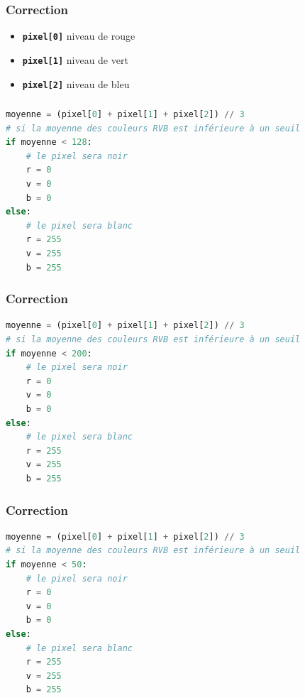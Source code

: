 \documentclass[svgnames,11pt]{beamer}
\begin{document}
\begin{frame}
    \frametitle{Correction}

    
\begin{itemize}
    \item \textbf{\texttt{pixel[0]}} niveau de rouge
    \item \textbf{\texttt{pixel[1]}} niveau de vert
    \item \textbf{\texttt{pixel[2]}} niveau de bleu
\end{itemize}
\end{frame}
\begin{frame}[fragile]
    \frametitle{}

    \begin{center}
        \begin{lstlisting}[language=Python , basicstyle=\ttfamily\small, xleftmargin=1em, xrightmargin=1em]
moyenne = (pixel[0] + pixel[1] + pixel[2]) // 3
# si la moyenne des couleurs RVB est inférieure à un seuil
if moyenne < 128:
    # le pixel sera noir
    r = 0
    v = 0
    b = 0
else:
    # le pixel sera blanc
    r = 255
    v = 255
    b = 255
\end{lstlisting}
        \label{CODE}
    \end{center}

\end{frame}
\begin{frame}[fragile]
    \frametitle{Correction}

    \begin{center}
        \begin{lstlisting}[language=Python , basicstyle=\ttfamily\small, xleftmargin=1em, xrightmargin=1em]
moyenne = (pixel[0] + pixel[1] + pixel[2]) // 3
# si la moyenne des couleurs RVB est inférieure à un seuil
if moyenne < 200:
    # le pixel sera noir
    r = 0
    v = 0
    b = 0
else:
    # le pixel sera blanc
    r = 255
    v = 255
    b = 255
\end{lstlisting}
        \label{CODE}
    \end{center}

\end{frame}
\begin{frame}[fragile]
    \frametitle{Correction}

    \begin{center}
        \begin{lstlisting}[language=Python , basicstyle=\ttfamily\small, xleftmargin=1em, xrightmargin=1em]
moyenne = (pixel[0] + pixel[1] + pixel[2]) // 3
# si la moyenne des couleurs RVB est inférieure à un seuil
if moyenne < 50:
    # le pixel sera noir
    r = 0
    v = 0
    b = 0
else:
    # le pixel sera blanc
    r = 255
    v = 255
    b = 255
\end{lstlisting}
        \label{CODE}
    \end{center}

\end{frame}
\end{document}
